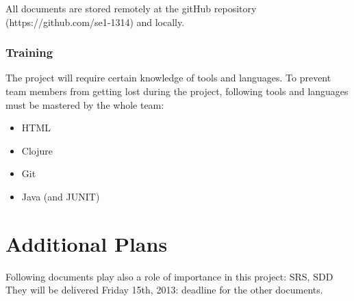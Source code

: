 \documentclass[12pt]{article}
\begin{document}
All documents are stored remotely at the gitHub repository
(https://github.com/se1-1314) and locally.

\subsubsection{Training}\label{training}

The project will require certain knowledge of tools and languages. To
prevent team members from getting lost during the project, following
tools and languages must be mastered by the whole team:

\begin{itemize}
\itemsep1pt\parskip0pt
\item
  HTML
\item
  Clojure
\item
  Git
\item
  Java (and JUNIT)
\end{itemize}

\section{Additional Plans}\label{additional-plans}

Following documents play also a role of importance in this project: SRS,
SDD They will be delivered Friday 15th, 2013: deadline for the other
documents.
\end{document}
